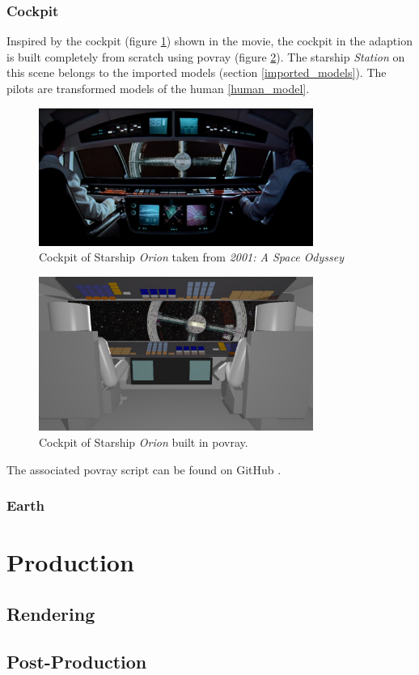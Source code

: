 \subsection{Cockpit} \label{cockpit_model}
Inspired by the cockpit (figure \ref{cockpit_original}) shown in the movie, the cockpit in the adaption  is built completely from scratch using povray (figure \ref{cockpit_povray}). The starship \textit{Station} on this scene belongs to the imported models (section \ref{imported_models}). 
The pilots are transformed models of the human \ref{human_model}. 
\begin{figure}[ht]
	\centering
	\includegraphics[width=0.8\textwidth]{images/original_cockpit_scene19.png}
	\caption{Cockpit of Starship \textit{Orion} taken from \textit{2001: A Space Odyssey}}
	\label{cockpit_original}
\end{figure}

\begin{figure}[ht]
	\centering
	\includegraphics[width=0.8\textwidth]{images/scene19587.png}
	\caption{Cockpit of Starship \textit{Orion} built in povray.}
	\label{cockpit_povray}
\end{figure}

The associated povray script can be found on GitHub \cite{Quving}.

\newpage
\subsection{Earth}

\chapter{Production}
\section{Rendering}
\section{Post-Production}
